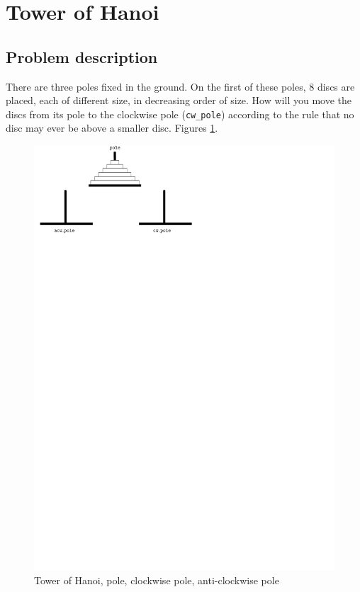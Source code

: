 \documentclass[11pt]{article}
\begin{document}
\section{Tower of Hanoi}
\label{sec-2}
\subsection*{Problem description}
\label{sec-2-1}
There are three poles fixed in the ground. On the first of
these poles, 8 discs are placed, each of different size, in
decreasing order of size. How will you move the discs from
its pole to the clockwise pole (\texttt{cw\_pole}) according to the
rule that no disc may ever be above a smaller disc.  Figures
\ref{fig:hanoi2}.
\begin{figure}[htb]
\centering
\includegraphics[width=.5\textwidth]{./hanoi2.pdf}
\caption{\label{fig:hanoi2}Tower of Hanoi, pole, clockwise pole, anti-clockwise pole}
\end{figure}
\end{document}
